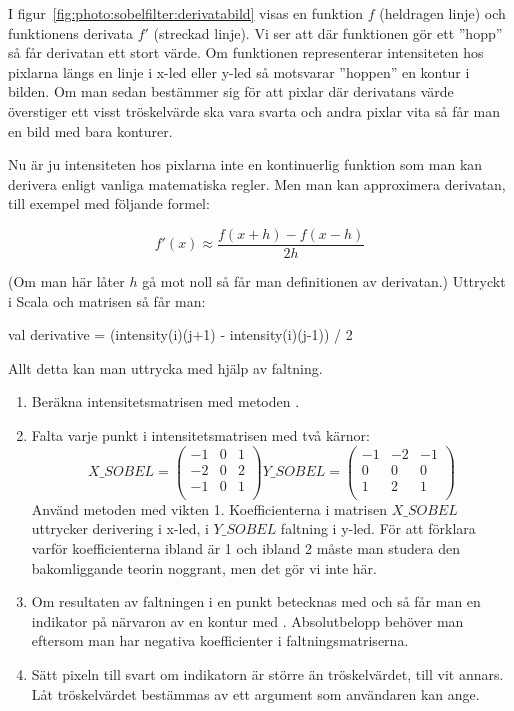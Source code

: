 I figur~\ref{fig:photo:sobelfilter:derivatabild} visas en funktion $f$ (heldragen linje) och funktionens derivata $f'$ (streckad linje). Vi ser att där funktionen gör ett ''hopp'' så får derivatan ett stort värde. Om funktionen representerar intensiteten hos pixlarna längs en linje i x-led eller y-led så motsvarar ''hoppen'' en kontur i bilden. Om man sedan bestämmer sig för att pixlar där derivatans värde överstiger ett visst tröskelvärde ska vara svarta och andra pixlar vita så får man en bild med bara konturer.

Nu är ju intensiteten hos pixlarna inte en kontinuerlig funktion som man kan derivera enligt vanliga matematiska regler. Men man kan approximera derivatan, till exempel med följande formel:

\begin{displaymath}
f'(x) \approx \frac{f(x+h) - f(x-h)}{2h}
\end{displaymath}

(Om man här låter $h$ gå mot noll så får man definitionen av derivatan.) Uttryckt i Scala och matrisen  så får man:

\begin{Code}
val derivative = (intensity(i)(j+1) - intensity(i)(j-1)) / 2
\end{Code}

Allt detta kan man uttrycka med hjälp av faltning.

\begin{enumerate}
	\item Beräkna intensitetsmatrisen med metoden .
	\item Falta varje punkt i intensitetsmatrisen med två kärnor:
$$
X\_SOBEL =
\begin{pmatrix}
  -1 & 0 & 1 \\
  -2 & 0 & 2 \\
  -1 & 0 & 1 \\
\end{pmatrix}
Y\_SOBEL =
\begin{pmatrix}
  -1 & -2 & -1 \\
  0 & 0 & 0 \\
  1 & 2 & 1 \\
\end{pmatrix}
$$
	Använd metoden  med vikten 1. Koefficienterna i matrisen $X\_SOBEL$ uttrycker derivering i x-led, i $Y\_SOBEL$ faltning i y-led. För att förklara varför koefficienterna ibland är 1 och ibland 2 måste man studera den bakomliggande teorin noggrant, men det gör vi inte här.
	\item Om resultaten av faltningen i en punkt betecknas med  och  så får man en indikator på närvaron av en kontur med . Absolutbelopp behöver man eftersom man har negativa koefficienter i faltningsmatriserna.
	\item  Sätt pixeln till svart om indikatorn är större än tröskelvärdet, till vit annars. Låt tröskelvärdet bestämmas av ett argument som användaren kan ange.
\end{enumerate}

